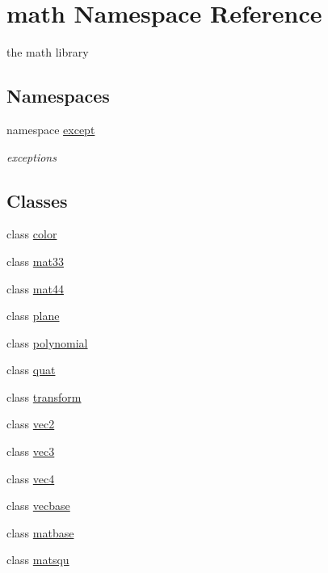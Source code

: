 \hypertarget{namespacemath}{
\section{math Namespace Reference}
\label{namespacemath}
}


the math library  
\subsection*{Namespaces}
\begin{DoxyCompactItemize}
\item 
namespace \hyperlink{namespacemath_1_1except}{except}


\begin{DoxyCompactList}\small\item\em exceptions \item\end{DoxyCompactList}\end{DoxyCompactItemize}
\subsection*{Classes}
\begin{DoxyCompactItemize}
\item 
class \hyperlink{classmath_1_1color}{color}
\item 
class \hyperlink{classmath_1_1mat33}{mat33}
\item 
class \hyperlink{classmath_1_1mat44}{mat44}
\item 
class \hyperlink{classmath_1_1plane}{plane}
\item 
class \hyperlink{classmath_1_1polynomial}{polynomial}
\item 
class \hyperlink{classmath_1_1quat}{quat}
\item 
class \hyperlink{classmath_1_1transform}{transform}
\item 
class \hyperlink{classmath_1_1vec2}{vec2}
\item 
class \hyperlink{classmath_1_1vec3}{vec3}
\item 
class \hyperlink{classmath_1_1vec4}{vec4}
\item 
class \hyperlink{classmath_1_1vecbase}{vecbase}
\item 
class \hyperlink{classmath_1_1matbase}{matbase}
\item 
class \hyperlink{classmath_1_1matsqu}{matsqu}
\end{DoxyCompactItemize}
